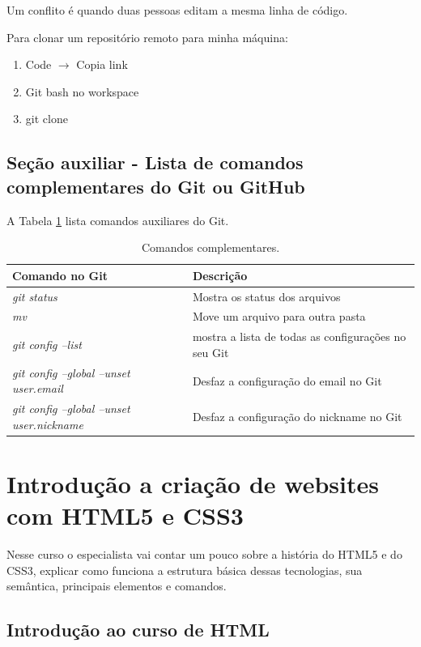 \documentclass[12pt,a4paper]{article}
\begin{document}
	Um conflito é quando duas pessoas editam a mesma linha de código.

	Para clonar um repositório remoto para minha máquina:
	\begin{enumerate}
		\item Code $\rightarrow$ Copia link
		\item Git bash no workspace
		\item git clone 
	\end{enumerate}
	
	\subsection{Seção auxiliar - Lista de comandos complementares do Git ou GitHub}
	
	A Tabela \ref{tab:ComandosComplementares} lista comandos auxiliares do Git.
	
	\begin{table}[!htpb]
		\centering
		\begin{tabular}{|p{}|p{}|}%
			\hline
			Comando no Git & Descrição \\
			\hline
			\textit{git status} & Mostra os status dos arquivos \\
			\hline
			\textit{mv} & Move um arquivo para outra pasta \\
			\hline
			\textit{git config --list} & mostra a lista de todas as configurações no seu Git \\
			\hline
			\textit{git config --global --unset user.email} & Desfaz a configuração do email no Git \\
			\hline
			\textit{git config --global --unset user.nickname} & Desfaz a configuração do nickname no Git \\
			\hline
		\end{tabular}
		\caption{Comandos complementares.}
		\label{tab:ComandosComplementares}
	\end{table}
	
	\section{Introdução a criação de websites com HTML5 e CSS3}
	
	Nesse curso o especialista vai contar um pouco sobre a história do HTML5 e do CSS3, explicar como funciona a estrutura básica dessas tecnologias, sua semântica, principais elementos e comandos.
	
	\subsection{Introdução ao curso de HTML}
\end{document}
